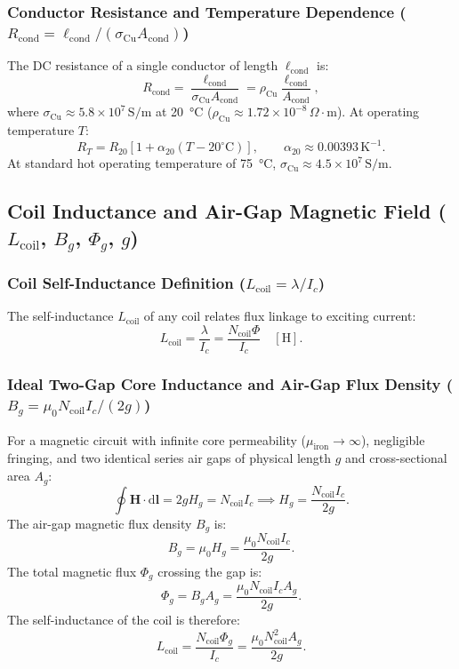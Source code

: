 \subsubsection{Conductor Resistance and Temperature Dependence ($R_{\mathrm{cond}} = \ell_{\mathrm{cond}} / (\sigma_{\mathrm{Cu}} A_{\mathrm{cond}})$)}
The DC resistance of a single conductor of length $\ell_{\mathrm{cond}}$ is:
\[
R_{\mathrm{cond}} = \frac{\ell_{\mathrm{cond}}}{\sigma_{\mathrm{Cu}} A_{\mathrm{cond}}} = \rho_{\mathrm{Cu}}\frac{\ell_{\mathrm{cond}}}{A_{\mathrm{cond}}},
\]
where $\sigma_{\mathrm{Cu}} \approx 5.8\times 10^7\,\mathrm{S/m}$ at \SI{20}{\degreeCelsius} ($\rho_{\mathrm{Cu}} \approx 1.72\times 10^{-8}\,\Omega\cdot\mathrm{m}$).
At operating temperature $T$:
\[
R_T = R_{20}\left[1 + \alpha_{20}(T - 20^\circ\mathrm{C})\right],
\qquad
\alpha_{20} \approx 0.00393\,\mathrm{K^{-1}}.
\]
At standard hot operating temperature of \SI{75}{\degreeCelsius}, $\sigma_{\mathrm{Cu}} \approx 4.5\times 10^7\,\mathrm{S/m}$.

\subsection{Coil Inductance and Air-Gap Magnetic Field ($L_{\mathrm{coil}}$, $B_g$, $\Phi_g$, $g$)}

\subsubsection{Coil Self-Inductance Definition ($L_{\mathrm{coil}} = \lambda / I_c$)}
The self-inductance $L_{\mathrm{coil}}$ of any coil relates flux linkage to exciting current:
\[
L_{\mathrm{coil}} = \frac{\lambda}{I_c} = \frac{N_{\mathrm{coil}}\Phi}{I_c}\quad[\mathrm{H}].
\]

\subsubsection{Ideal Two-Gap Core Inductance and Air-Gap Flux Density ($B_g = \mu_0 N_{\mathrm{coil}} I_c / (2g)$)}
For a magnetic circuit with infinite core permeability ($\mu_{\mathrm{iron}}\to\infty$), negligible fringing, and two identical series air gaps of physical length $g$ and cross-sectional area $A_g$:
\[
\oint \mathbf{H}\cdot\mathrm{d}\mathbf{l} = 2 g H_g = N_{\mathrm{coil}} I_c
\implies
H_g = \frac{N_{\mathrm{coil}} I_c}{2g}.
\]
The air-gap magnetic flux density $B_g$ is:
\[
B_g = \mu_0 H_g = \frac{\mu_0 N_{\mathrm{coil}} I_c}{2g}.
\]
The total magnetic flux $\Phi_g$ crossing the gap is:
\[
\Phi_g = B_g A_g = \frac{\mu_0 N_{\mathrm{coil}} I_c A_g}{2g}.
\]
The self-inductance of the coil is therefore:
\[
L_{\mathrm{coil}} = \frac{N_{\mathrm{coil}}\Phi_g}{I_c} = \frac{\mu_0 N_{\mathrm{coil}}^2 A_g}{2g}.
\]


